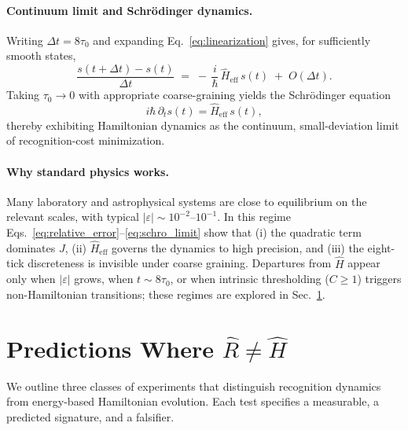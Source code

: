 \documentclass[aps,prx,twocolumn,superscriptaddress,nofootinbib]{revtex4-2}
\newcommand{\Rhat}{\hat{R}}
\newcommand{\Hhat}{\hat{H}}
\newcommand{\Jcost}{J}
\newcommand{\Ccost}{C}
\newcommand{\TauZero}{\tau_{0}}
\begin{document}
\paragraph*{Continuum limit and Schrödinger dynamics.} Writing \(\Delta t=8\TauZero\) and expanding Eq.~\eqref{eq:linearization} gives, for sufficiently smooth states,
\begin{equation}\label{eq:schro_limit}
  \frac{s(t+\Delta t)-s(t)}{\Delta t} \;=\; -\,\frac{i}{\hbar}\,\Hhat_{\!\mathrm{eff}}\,s(t)\; +\; O(\Delta t).
\end{equation}
Taking \(\TauZero\to 0\) with appropriate coarse-graining yields the Schrödinger equation
\begin{equation}
  i\hbar\,\partial_t s(t) = \Hhat_{\!\mathrm{eff}}\,s(t),
\end{equation}
thereby exhibiting Hamiltonian dynamics as the continuum, small-deviation limit of recognition-cost minimization.

\paragraph*{Why standard physics works.} Many laboratory and astrophysical systems are close to equilibrium on the relevant scales, with typical \(|\varepsilon|\sim 10^{-2}\!\text{--}\!10^{-1}\). In this regime Eqs.~\eqref{eq:relative_error}--\eqref{eq:schro_limit} show that (i) the quadratic term dominates \(\Jcost\), (ii) \(\Hhat_{\!\mathrm{eff}}\) governs the dynamics to high precision, and (iii) the eight-tick discreteness is invisible under coarse graining. Departures from \(\Hhat\) appear only when \(|\varepsilon|\) grows, when \(t\sim 8\TauZero\), or when intrinsic thresholding (\(\Ccost\ge 1\)) triggers non-Hamiltonian transitions; these regimes are explored in Sec.~\ref{sec:predictions}.

\section{Predictions Where $\Rhat\neq\Hhat$}\label{sec:predictions}
We outline three classes of experiments that distinguish recognition dynamics from energy-based Hamiltonian evolution. Each test specifies a measurable, a predicted signature, and a falsifier.
\end{document}
